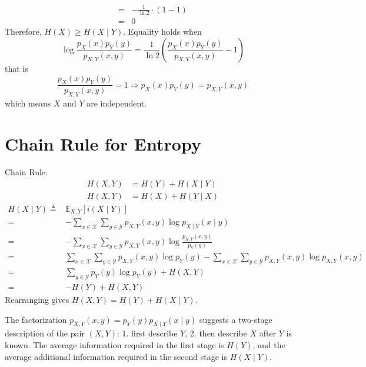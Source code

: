 \documentclass[11pt]{report}
\theoremstyle{lecturedefinition}
\theoremstyle{lectureremark}
\begin{document}
\begin{property}
\begin{equation*}
\begin{aligned}
    =&-\frac{1}{\ln 2}\cdot (1-1)\\
    =&0
\end{aligned}
\end{equation*}
Therefore, $H(X)\ge H(X\mid Y)$. Equality holds when \begin{equation*}
    \log\frac{p_X(x)p_Y(y)}{p_{X,Y}(x,y)}=\frac{1}{\ln 2}\left(\frac{p_X(x)p_Y(y)}{p_{X,Y}(x,y)}-1\right)
\end{equation*}
that is
\begin{equation*}
\frac{p_X(x)p_Y(y)}{p_{X,Y}(x,y)}=1\Rightarrow p_X(x)p_Y(y)=p_{X,Y}(x,y)
\end{equation*}
which means $X$ and $Y$ are independent.
\end{property}

\section{Chain Rule for Entropy}
\begin{theorem}
Chain Rule:
\begin{equation*}
\begin{aligned}
    H(X,Y)&=H(Y)+H(X\mid Y)\\
    H(X,Y)&=H(X)+H(Y\mid X)
\end{aligned}
\end{equation*}
\tcblower
\begin{equation*}
\begin{aligned}
H(X\mid Y)\triangleq& \mathbb{E}_{X,Y}\left[i(X\mid Y)\right]\\
=&-\sum_{x\in\mathcal{X}}\sum_{y\in\mathcal{Y}}p_{X,Y}(x,y)\log p_{X\mid Y}(x\mid y)\\
=& -\sum_{x\in\mathcal{X}}\sum_{y\in\mathcal{Y}}p_{X,Y}(x,y)\log \frac{p_{X,Y}(x,y)}{p_Y(y)}\\
=&\sum_{x\in\mathcal{X}}\sum_{y\in\mathcal{Y}}p_{X,Y}(x,y)\log p_Y(y)-\sum_{x\in\mathcal{X}}\sum_{y\in\mathcal{Y}}p_{X,Y}(x,y)\log p_{X,Y}(x,y)\\
=&\sum_{y\in\mathcal{Y}}p_Y(y)\log p_Y(y)+H(X,Y)\\
=&-H(Y)+H(X,Y)
\end{aligned}
\end{equation*}
Rearranging gives $H(X,Y)=H(Y)+H(X\mid Y)$.
\end{theorem}
The factorization $p_{X,Y}(x,y)=p_Y(y)p_{X\mid Y}(x\mid y)$ suggests a two-stage description of the pair $(X,Y)$: 1. first describe $Y$, 2. then describe $X$ after $Y$ is known. The average information required in the first stage is $H(Y)$, and the average additional information required in the second stage is $H(X\mid Y)$.
\end{document}

